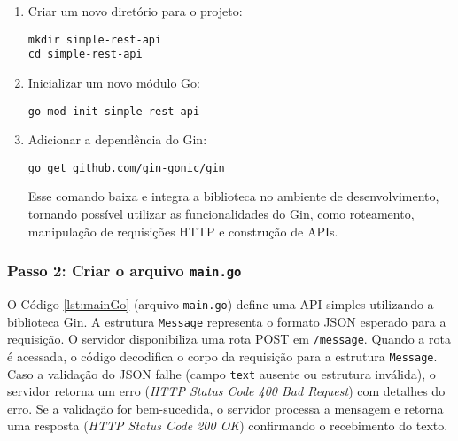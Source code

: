 \begin{enumerate}
    \item Criar um novo diretório para o projeto:
    \begin{verbatim}
mkdir simple-rest-api
cd simple-rest-api
    \end{verbatim}

    \item Inicializar um novo módulo Go:
    \begin{verbatim}
go mod init simple-rest-api
    \end{verbatim}

    \item Adicionar a dependência do Gin:
    \begin{verbatim}
go get github.com/gin-gonic/gin
    \end{verbatim}
    Esse comando baixa e integra a biblioteca no ambiente de desenvolvimento, tornando possível utilizar as funcionalidades do Gin, como roteamento, manipulação de requisições HTTP e construção de APIs. 
\end{enumerate}

\subsubsection{Passo 2: Criar o arquivo \texttt{main.go}}

O Código \ref{lst:mainGo} (arquivo \texttt{main.go}) define uma API simples utilizando a biblioteca Gin. A estrutura \verb|Message| representa o formato JSON esperado para a requisição. O servidor disponibiliza uma rota POST em \verb|/message|. Quando a rota é acessada, o código decodifica o corpo da requisição para a estrutura \verb|Message|. Caso a validação do JSON falhe (campo \verb|text| ausente ou estrutura inválida), o servidor retorna um erro (\textit{HTTP Status Code 400 Bad Request}) com detalhes do erro. Se a validação for bem-sucedida, o servidor processa a mensagem e retorna uma resposta (\textit{HTTP Status Code 200 OK}) confirmando o recebimento do texto.

